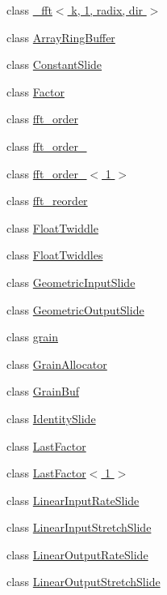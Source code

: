 \begin{DoxyCompactItemize}
class \hyperlink{class__sbsms___1_1__fft_3_01k_00_011_00_01radix_00_01dir_01_4}{\+\_\+fft$<$ k, 1, radix, dir $>$}
\item 
class \hyperlink{class__sbsms___1_1_array_ring_buffer}{Array\+Ring\+Buffer}
\item 
class \hyperlink{class__sbsms___1_1_constant_slide}{Constant\+Slide}
\item 
class \hyperlink{class__sbsms___1_1_factor}{Factor}
\item 
class \hyperlink{class__sbsms___1_1fft__order}{fft\+\_\+order}
\item 
class \hyperlink{class__sbsms___1_1fft__order__}{fft\+\_\+order\+\_\+}
\item 
class \hyperlink{class__sbsms___1_1fft__order___3_011_01_4}{fft\+\_\+order\+\_\+$<$ 1 $>$}
\item 
class \hyperlink{class__sbsms___1_1fft__reorder}{fft\+\_\+reorder}
\item 
class \hyperlink{class__sbsms___1_1_float_twiddle}{Float\+Twiddle}
\item 
class \hyperlink{class__sbsms___1_1_float_twiddles}{Float\+Twiddles}
\item 
class \hyperlink{class__sbsms___1_1_geometric_input_slide}{Geometric\+Input\+Slide}
\item 
class \hyperlink{class__sbsms___1_1_geometric_output_slide}{Geometric\+Output\+Slide}
\item 
class \hyperlink{class__sbsms___1_1grain}{grain}
\item 
class \hyperlink{class__sbsms___1_1_grain_allocator}{Grain\+Allocator}
\item 
class \hyperlink{class__sbsms___1_1_grain_buf}{Grain\+Buf}
\item 
class \hyperlink{class__sbsms___1_1_identity_slide}{Identity\+Slide}
\item 
class \hyperlink{class__sbsms___1_1_last_factor}{Last\+Factor}
\item 
class \hyperlink{class__sbsms___1_1_last_factor_3_011_01_4}{Last\+Factor$<$ 1 $>$}
\item 
class \hyperlink{class__sbsms___1_1_linear_input_rate_slide}{Linear\+Input\+Rate\+Slide}
\item 
class \hyperlink{class__sbsms___1_1_linear_input_stretch_slide}{Linear\+Input\+Stretch\+Slide}
\item 
class \hyperlink{class__sbsms___1_1_linear_output_rate_slide}{Linear\+Output\+Rate\+Slide}
\item 
class \hyperlink{class__sbsms___1_1_linear_output_stretch_slide}{Linear\+Output\+Stretch\+Slide}

\end{DoxyCompactItemize}
